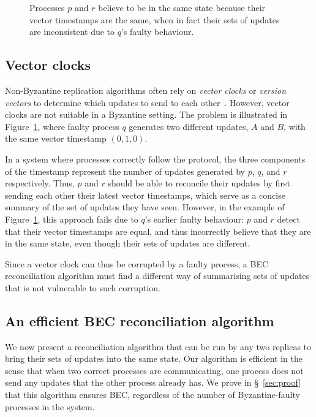 \documentclass[a4paper,anonymous,USenglish]{lipics-v2019}
\begin{document}
\begin{figure}
    \centering
    
    \caption{Processes $p$ and $r$ believe to be in the same state because their vector timestamps are the same, when in fact their sets of updates are inconsistent due to $q$'s faulty behaviour.}
    \label{fig:vectorclocks}
\end{figure}

\subsection{Vector clocks}

Non-Byzantine replication algorithms often rely on \emph{vector clocks} or \emph{version vectors} to determine which updates to send to each other~\cite{Ahamad:1995,Lloyd:2011,Schwarz:1994}.
However, vector clocks are not suitable in a Byzantine setting.
The problem is illustrated in Figure~\ref{fig:vectorclocks}, where faulty process $q$ generates two different updates, $A$ and $B$, with the same vector timestamp $(0, 1, 0)$.

In a system where processes correctly follow the protocol, the three components of the timestamp represent the number of updates generated by $p$, $q$, and $r$ respectively.
Thus, $p$ and $r$ should be able to reconcile their updates by first sending each other their latest vector timestamps, which serve as a concise summary of the set of updates they have seen.
However, in the example of Figure~\ref{fig:vectorclocks}, this approach fails due to $q$'s earlier faulty behaviour: $p$ and $r$ detect that their vector timestamps are equal, and thus incorrectly believe that they are in the same state, even though their sets of updates are different.

Since a vector clock can thus be corrupted by a faulty process, a BEC reconciliation algorithm must find a different way of summarising sets of updates that is not vulnerable to such corruption.

\subsection{An efficient BEC reconciliation algorithm}\label{sec:algorithm1}

We now present a reconciliation algorithm that can be run by any two replicas to bring their sets of updates into the same state.
Our algorithm is efficient in the sense that when two correct processes are communicating, one process does not send any updates that the other process already has.
We prove in \S~\ref{sec:proof} that this algorithm ensures BEC, regardless of the number of Byzantine-faulty processes in the system.
\end{document}
